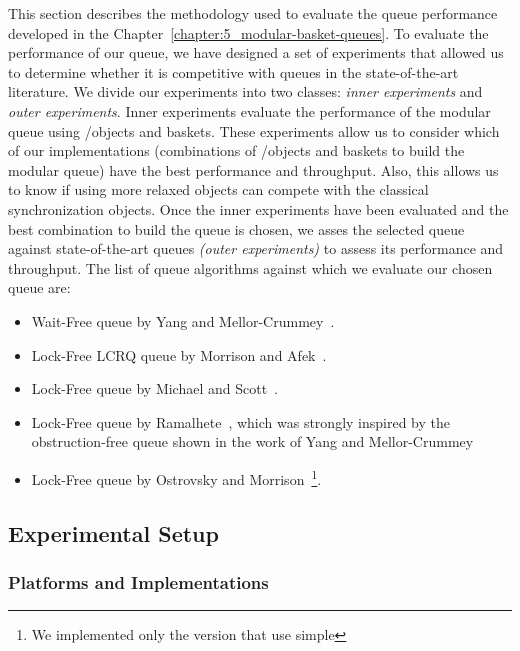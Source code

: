 This section describes the methodology used to evaluate the queue performance developed in the Chapter~\ref{chapter:5_modular-basket-queues}. To evaluate the performance of our queue, we have designed a set of experiments that allowed us to determine whether it is competitive with queues in the state-of-the-art literature.
We divide our experiments into two classes: \emph{inner experiments} and \emph{outer experiments}.
Inner experiments evaluate the performance of the modular queue using \LL/\IC objects and baskets. These experiments allow us to consider which of our implementations (combinations of \LL/\IC objects and baskets to build the modular queue) have the best performance and throughput. Also, this allows us to know if using more relaxed objects can compete with the classical synchronization objects. Once the inner experiments have been evaluated and the best combination to build the queue is chosen, we asses the selected queue against state-of-the-art queues \emph{(outer experiments)} to assess its performance and throughput. The list of queue
algorithms against which we evaluate our chosen queue are:

\begin{itemize}
    \item Wait-Free queue by Yang and Mellor-Crummey~\cite{DBLP_conf_ppopp_YangM16}.
    \item Lock-Free LCRQ queue by Morrison and Afek~\cite{ppopp2013x86queues}.
    \item Lock-Free queue by Michael and Scott~\cite{DBLP_conf_podc_MichaelS96}.
    \item Lock-Free queue by Ramalhete~\cite{Ramalhete_Correia_MPMC_2016}, which was strongly inspired by the obstruction\hyp{}free queue shown in the work of Yang and Mellor-Crummey~\cite{DBLP_conf_ppopp_YangM16}
    \item Lock-Free queue by Ostrovsky and Morrison~\cite{scalingconcurrent2020}\footnote{We implemented only the version that use simple \CAS}.
\end{itemize}

\subsection{\label{subsec:queue-experimental-setup}Experimental Setup}
\subsubsection{Platforms and Implementations}

